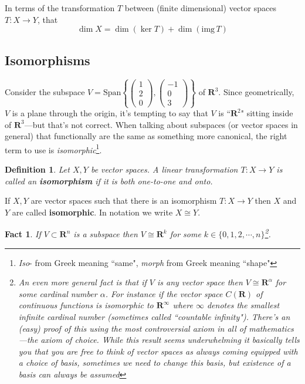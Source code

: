 \documentclass[12pt]{article}
\numberwithin{equation}{subsection}
\numberwithin{figure}{subsection}
\newtheorem{defn}[subsection]{Definition}
\newtheorem{fact}[subsection]{Fact}
\theoremstyle{note}
\newcommand{\img}{\mathrm{img\,}}
\newcommand\Span[1]{\mathrm{Span}\left\{#1\right\}}
\begin{document}
In terms of the transformation $T$ between (finite dimensional) vector spaces $T\colon X\to Y$, that \[ \dim X=\dim (\ker T)+\dim(\img T)\]


\subsection{Isomorphisms}
Consider the subspace $V=\Span{ \begin{pmatrix} 1 \\ 2 \\ 0 \end{pmatrix}, \begin{pmatrix} -1 \\ 0 \\ 3\end{pmatrix}}$ of $\mathbf{R}^3$. Since geometrically, $V$ is a plane through the origin, it's tempting to say that $V$ is ``$\mathbf{R}^2$" sitting inside of $\mathbf{R}^3$---but that's not correct. When talking about subspaces (or vector spaces in general) that functionally are the same as something more canonical, the right term to use is \textit{isomorphic}\footnote{\textit{Iso}- from Greek meaning ``same", \textit{morph} from Greek meaning ``shape"}. 

\begin{defn}Let $X,Y$ be vector spaces. A linear transformation $T\colon X\to Y$ is called an \textbf{isomorphism} if it is both one-to-one and onto. \end{defn}
If $X,Y$ are vector spaces such that there is an isomorphism $T\colon X\to Y$ then $X$ and $Y$ are called \textbf{isomorphic}. In notation we write $X\cong Y$. 

\begin{fact}
If $V\subset \mathbf{R}^n$ is a subspace then $V\cong \mathbf{R}^k$ for some $k\in \{0,1,2,\cdots,n\}$\footnote{An even more general fact is that if $V$ is \textit{any} vector space then $V\cong \mathbf{R}^{\alpha}$ for some cardinal number $\alpha$. For instance if the vector space $C(\mathbf{R})$ of continuous functions is isomorphic to $\mathbf{R}^{\infty}$ where $\infty$ denotes the smallest infinite cardinal number (sometimes called ``countable infinity"). There's an (easy) proof of this using the most controversial axiom in all of mathematics---\textit{the axiom of choice}. While this result seems underwhelming it basically tells you that you are free to think of vector spaces as always coming equipped with a choice of basis, sometimes we need to change this basis, but existence of a basis can always be assumed}.
\end{fact}
\end{document}
